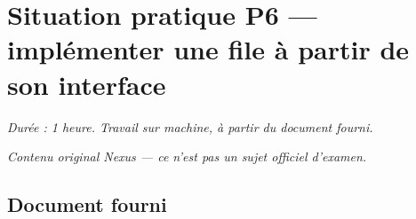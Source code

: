 \section*{Situation pratique P6 --- implémenter une file à partir de son interface}

\textit{Durée : 1 heure. Travail sur machine, à partir du document fourni.}

\medskip
\textit{Contenu original Nexus --- ce n'est pas un sujet officiel d'examen.}

\subsection*{Document fourni}

